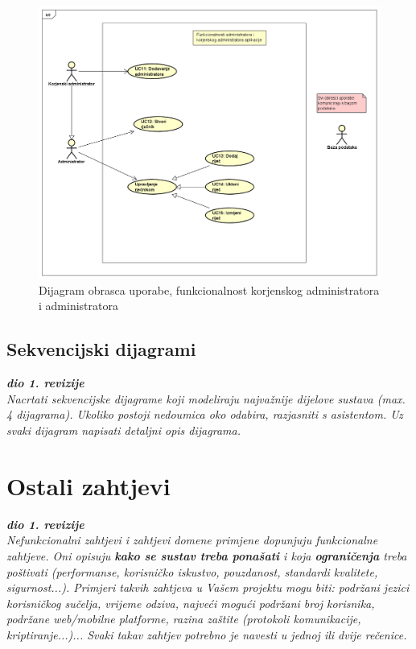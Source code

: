					\begin{figure}[H]
						\includegraphics[width=\textwidth]{dijagrami/ucdiag2.png} %
						\caption{Dijagram obrasca uporabe, funkcionalnost korjenskog administratora i administratora}
						\label{fig:ucdiag2} %
					\end{figure}

				\eject		
				
			\subsection{Sekvencijski dijagrami}
				
				\textbf{\textit{dio 1. revizije}}\\
				
				\textit{Nacrtati sekvencijske dijagrame koji modeliraju najvažnije dijelove sustava (max. 4 dijagrama). Ukoliko postoji nedoumica oko odabira, razjasniti s asistentom. Uz svaki dijagram napisati detaljni opis dijagrama.}
				\eject
	
		\section{Ostali zahtjevi}
		
			\textbf{\textit{dio 1. revizije}}\\
		 
			 \textit{Nefunkcionalni zahtjevi i zahtjevi domene primjene dopunjuju funkcionalne zahtjeve. Oni opisuju \textbf{kako se sustav treba ponašati} i koja \textbf{ograničenja} treba poštivati (performanse, korisničko iskustvo, pouzdanost, standardi kvalitete, sigurnost...). Primjeri takvih zahtjeva u Vašem projektu mogu biti: podržani jezici korisničkog sučelja, vrijeme odziva, najveći mogući podržani broj korisnika, podržane web/mobilne platforme, razina zaštite (protokoli komunikacije, kriptiranje...)... Svaki takav zahtjev potrebno je navesti u jednoj ili dvije rečenice.}
			 
			 
			 
	